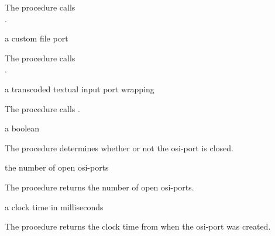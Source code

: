 The  procedure calls\\
.

\begin{procedure}
\end{procedure}
\returns{} a custom file port

The  procedure calls\\
.

\begin{procedure}
\end{procedure}
\returns{} a transcoded textual input port wrapping 

The  procedure calls
.

\begin{procedure}
\end{procedure}
\returns{} a boolean

The  procedure determines whether or not the
osi-port  is closed.

\begin{procedure}
\end{procedure}
\returns{} the number of open osi-ports

The  procedure returns the number of open
osi-ports.

\begin{procedure}
\end{procedure}
\returns{} a clock time in milliseconds

The  procedure returns the clock time from
 when the osi-port  was created.

